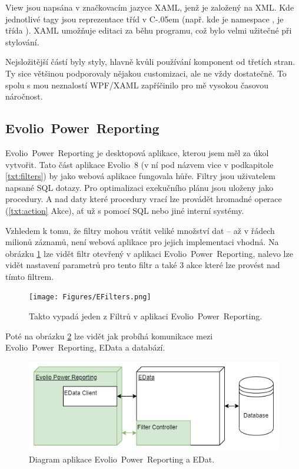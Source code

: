 \documentclass[czech,bachelorpractice,dept460,male,csharp]{diploma}
\newcommand{\EvolioEight}{Evolio~8}
\newcommand{\EFilters}{Evolio~Power~Reporting}
\newcommand{\EData}{EData}
\newcommand{\Csharp}{%
  {\settoheight{\dimen0}{C}C\kern-.05em \resizebox{!}{\dimen0}{\raisebox{\depth}{\#}}}}
\begin{document}
			View jsou napsána v značkovacím jazyce XAML\cite{xaml}, jenž je založený na XML. Kde jednotlivé tagy jsou reprezentace tříd v {\Csharp} (např.  kde  je namespace , je třída  ). XAML umožňuje editaci za běhu programu, což bylo velmi užitečné při stylování. 
			
			Nejsložitější částí byly styly, hlavně kvůli používání komponent od třetích stran. Ty sice většinou podporovaly nějakou customizaci, ale ne vždy dostatečně. To spolu s mou neznalostí WPF/XAML zapříčinilo pro mě vysokou časovou náročnost.
	\subsection{\EFilters}
		{\EFilters} je desktopová aplikace, kterou jsem měl za úkol vytvořit. Tato část aplikace {\EvolioEight} (v ní pod názvem  vice v podkapitole \ref{txt:filters}) by jako webová aplikace fungovala hůře.
		Filtry jsou uživatelem napsané SQL dotazy. Pro optimalizaci exekučního plánu jsou uloženy jako procedury. A nad daty které procedury vrací lze provádět hromadné operace (\ref{txt:action} Akce), ať už s pomocí SQL nebo jiné interní systémy.
		
		Vzhledem k tomu, že filtry mohou vrátit veliké množství dat – až v řádech milionů záznamů, není webová aplikace pro jejich implementaci vhodná. Na obrázku \ref{fig:EFilters} lze vidět filtr otevřený v aplikaci {\EFilters}, nalevo lze vidět nastavení parametrů pro tento filtr a také 3 akce které lze provést nad tímto filtrem.

			
			\begin{figure}[h!]
				\texttt{[image: Figures/EFilters.png]}
				\caption{Takto vypadá jeden z Filtrů v aplikaci {\EFilters}.}
    			\label{fig:EFilters}
			\end{figure}
					Poté na obrázku \ref{fig:EFiltersDiagram} lze vidět jak probíhá komunikace mezi \EFilters, {\EData} a databází.
			\begin{figure}[h]
				\includegraphics[width=1.0\textwidth]{Figures/EfiltersDiagram.png}
				\caption{Diagram aplikace {\EFilters} a EDat.}
    			\label{fig:EFiltersDiagram}
			\end{figure}
\end{document}
